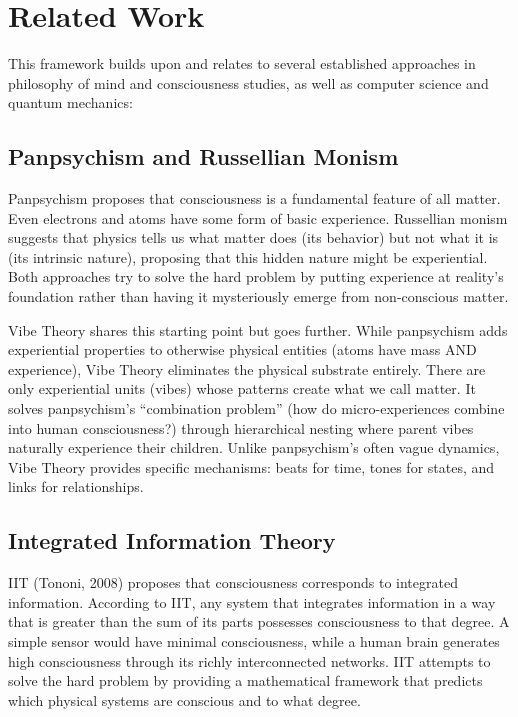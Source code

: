 \section{Related Work}

This framework builds upon and relates to several established approaches in philosophy of mind and consciousness studies, as well as computer science and quantum mechanics:

\subsection{Panpsychism and Russellian Monism}

Panpsychism proposes that consciousness is a fundamental feature of all matter. Even electrons and atoms have some form of basic experience. Russellian monism suggests that physics tells us what matter does (its behavior) but not what it is (its intrinsic nature), proposing that this hidden nature might be experiential. Both approaches try to solve the hard problem by putting experience at reality's foundation rather than having it mysteriously emerge from non-conscious matter.

Vibe Theory shares this starting point but goes further. While panpsychism adds experiential properties to otherwise physical entities (atoms have mass AND experience), Vibe Theory eliminates the physical substrate entirely. There are only experiential units (vibes) whose patterns create what we call matter. It solves panpsychism's ``combination problem'' (how do micro-experiences combine into human consciousness?) through hierarchical nesting where parent vibes naturally experience their children. Unlike panpsychism's often vague dynamics, Vibe Theory provides specific mechanisms: beats for time, tones for states, and links for relationships.

\subsection{Integrated Information Theory}

IIT (Tononi, 2008) proposes that consciousness corresponds to integrated information. According to IIT, any system that integrates information in a way that is greater than the sum of its parts possesses consciousness to that degree. A simple sensor would have minimal consciousness, while a human brain generates high consciousness through its richly interconnected networks. IIT attempts to solve the hard problem by providing a mathematical framework that predicts which physical systems are conscious and to what degree.

